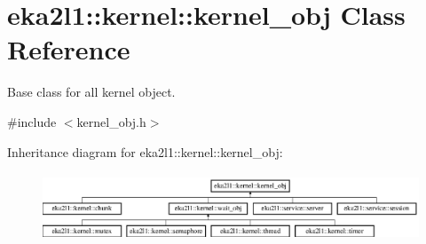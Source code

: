 \hypertarget{classeka2l1_1_1kernel_1_1kernel__obj}{}\section{eka2l1\+:\+:kernel\+:\+:kernel\+\_\+obj Class Reference}
\label{classeka2l1_1_1kernel_1_1kernel__obj}


Base class for all kernel object.  




{\ttfamily \#include $<$kernel\+\_\+obj.\+h$>$}

Inheritance diagram for eka2l1\+:\+:kernel\+:\+:kernel\+\_\+obj\+:\begin{figure}[H]
\begin{center}
\leavevmode
\includegraphics[height=2.024096cm]{classeka2l1_1_1kernel_1_1kernel__obj}
\end{center}
\end{figure}
